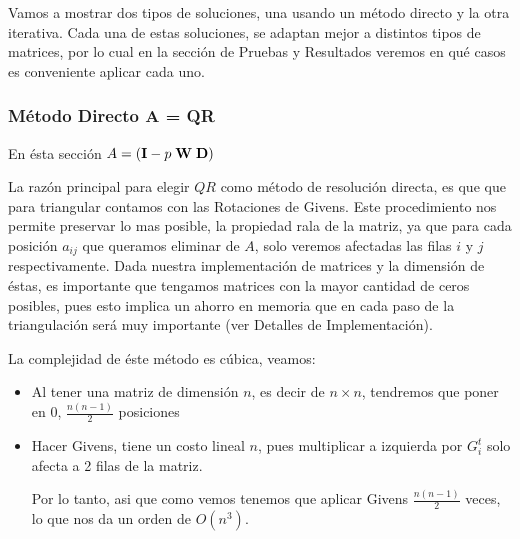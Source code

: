 Vamos a mostrar dos tipos de soluciones, una usando un método directo y la otra iterativa. Cada una de estas soluciones, se adaptan mejor a distintos tipos de matrices, por lo cual en la sección de Pruebas y Resultados veremos en qué casos es conveniente aplicar cada uno.

\subsubsection{Método Directo A = QR}

En ésta sección $A = ({\bf I} - p \; {\bf W} \; {\bf D})$

La razón principal para elegir $QR$ como método de resolución directa, es que que para triangular contamos con las Rotaciones de Givens. Este procedimiento nos permite preservar lo mas posible, la propiedad rala de la matriz, ya que para cada posición $a_{ij}$ que queramos eliminar de $A$, solo veremos afectadas las filas $i$ y $j$ respectivamente. Dada nuestra implementación de matrices y la dimensión de éstas, es importante que tengamos matrices con la mayor cantidad de ceros posibles, pues esto implica un ahorro en memoria que en cada paso de la triangulación será muy importante (ver Detalles de Implementación).

La complejidad de éste método es cúbica, veamos:

\begin{itemize}
    \item Al tener una matriz de dimensión $n$, es decir de $n \times n$, tendremos que poner en $0$, $\frac{n(n - 1)}{2}$ posiciones
    \item Hacer Givens, tiene un costo lineal $n$, pues multiplicar a izquierda por $G^{t}_i$ solo afecta a 2 filas de la matriz.

Por lo tanto, asi que como vemos tenemos que aplicar Givens $\frac{n(n - 1)}{2}$ veces, lo que nos da un orden de $O(n^3)$.

\end{itemize}



